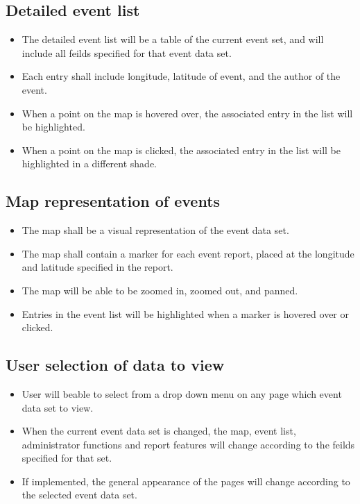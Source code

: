 \subsection{Detailed event list}
\begin{itemize}
\item The detailed event list will be a table of the current event set, and will include all feilds specified for that event data set.
\item Each entry shall include longitude, latitude of event, and the author of the event.
\item When a point on the map is hovered over, the associated entry in the list will be highlighted.
\item When a point on the map is clicked, the associated entry in the list will be highlighted in a different shade.
\end{itemize}

\subsection{Map representation of events}
\begin{itemize}
\item The map shall be a visual representation of the event data set. 
\item The map shall contain a marker for each event report, placed at the longitude and latitude specified in the report.
\item The map will be able to be zoomed in, zoomed out, and panned.
\item Entries in the event list will be highlighted when a marker is hovered over or clicked.
\end{itemize}

\subsection{User selection of data to view}
\begin{itemize}
\item User will beable to select from a drop down menu on any page which event data set to view. 
\item When the current event data set is changed, the map, event list, administrator functions and report features will change according to the feilds specified for that set.
\item If implemented, the general appearance of the pages will change according to the selected event data set.
\end{itemize}



